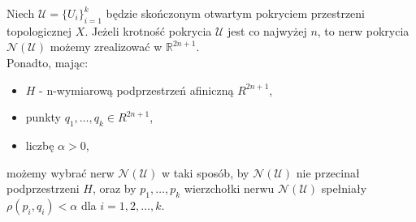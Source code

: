 \begin{twie}
    Niech $\mathcal{U}=\{U_i\}_{i=1}^k$ będzie skończonym otwartym pokryciem przestrzeni topologicznej $X$. Jeżeli krotność pokrycia $\mathcal{U}$ jest co najwyżej $n$, to nerw pokrycia $\mathcal{N(U)}$ możemy zrealizować w $\mathbb{R}^{2n+1}$. \\
    Ponadto, mając:
    \begin{itemize}
        \item $H$ - n-wymiarową podprzestrzeń afiniczną  $R^{2n+1}$,
        \item punkty $q_1, \ldots, q_k\in R^{2n+1}$,
        \item liczbę $\alpha>0$,
    \end{itemize} 
    możemy wybrać nerw $\mathcal{N(U)}$ w taki sposób, by $\mathcal{N(U)}$ nie przecinał podprzestrzeni $H$, oraz by $p_1, \ldots, p_k$ wierzchołki nerwu $\mathcal{N(U)}$ spełniały $\rho(p_i, q_i)<\alpha$ dla $i=1,2,\ldots, k$.
\end{twie}
